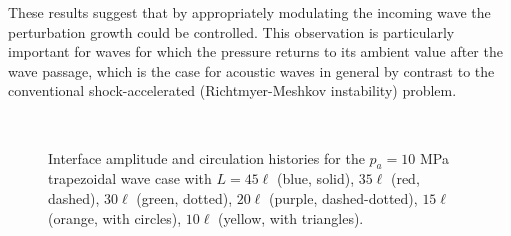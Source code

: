 \documentclass{jfm}%
\begin{document}
These results suggest that by appropriately modulating the incoming
wave the perturbation growth could be controlled. This observation is
particularly important for waves for which the pressure returns to
its ambient value after the wave passage, which is the case for
acoustic waves in general by contrast to the conventional
shock-accelerated (Richtmyer-Meshkov instability) problem.

\begin{figure}
  \centering
  \begin{subfigure}{0.48\textwidth}
    \centering
    \label{fig:trapz_interface_multi-lag} 
  \end{subfigure}
  ~
  \begin{subfigure}{0.48\textwidth}
    \centering
    \label{fig:trapz_circ_multi-lag}%
  \end{subfigure}
  \caption[The interface and circulation dependence on wave
  duration]{Interface amplitude 
    and circulation  histories for
    the $p_a=10$ MPa trapezoidal wave case with $L=45\ell$ (blue, solid),
    $35\ell$ (red, dashed), $30\ell$ (green, dotted), $20\ell$ (purple, dashed-dotted),
    $15\ell$ (orange, with circles), $10\ell$ (yellow, with triangles).}
  \label{fig:trapz_circ_interface_multi-lag}
\end{figure}
%
%
%
%
%
\end{document}
